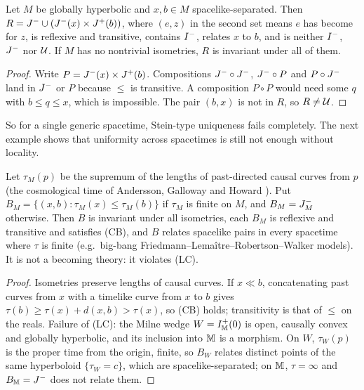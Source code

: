 \begin{proposition}\label{prop:single}
Let $M$ be globally hyperbolic and $x,b\in M$ spacelike-separated. Then
$R=J^{-}\cup(J^{-}(x)\times J^{+}(b))$, where $(e,z)$ in the second set means $e$
has become for $z$, is reflexive and transitive, contains $I^{-}$, relates $x$
to $b$, and is neither $I^{-}$, $J^{-}$ nor $\mathcal U$. If $M$ has no nontrivial
isometries, $R$ is invariant under all of them.
\end{proposition}

\begin{proof}
Write $P=J^{-}(x)\times J^{+}(b)$. Compositions $J^{-}\circ J^{-}$, $J^{-}\circ P$ and
$P\circ J^{-}$ land in $J^{-}$ or $P$ because $\le$ is transitive. A composition
$P\circ P$ would need some $q$ with $b\le q\le x$, which is impossible. The
pair $(b,x)$ is not in $R$, so $R\neq\mathcal U$.
\end{proof}

So for a single generic spacetime, Stein-type uniqueness fails completely. The
next example shows that
uniformity across spacetimes is still not enough without locality.

\begin{proposition}\label{prop:nonlocal}
Let $\tau_M(p)$ be the supremum of the lengths of past-directed causal curves
from $p$ (the cosmological time of Andersson, Galloway and Howard
\citep{AGH1998}). Put $B_M=\{(x,b):\tau_M(x)\le\tau_M(b)\}$ if $\tau_M$ is
finite on $M$, and $B_M=J^{-}_M$ otherwise. Then $B$ is invariant under all
isometries, each $B_M$ is
reflexive and transitive and satisfies (CB), and $B$ relates spacelike pairs
in every spacetime where $\tau$ is finite (e.g.\ big-bang
Friedmann--Lemaître--Robertson--Walker models). It is not a becoming theory:
it violates (LC).
\end{proposition}

\begin{proof}
Isometries preserve lengths of causal curves. If $x\ll b$, concatenating
past curves from $x$ with a timelike curve from $x$ to $b$ gives
$\tau(b)\ge\tau(x)+d(x,b)>\tau(x)$, so (CB) holds; transitivity is that of
$\le$ on the reals. Failure of (LC): the Milne wedge $W=I^{+}_\mathbb M(0)$ is open,
causally convex and globally hyperbolic, and its inclusion into $\mathbb M$ is a
morphism. On $W$, $\tau_W(p)$ is the proper time from the origin, finite, so
$B_W$ relates distinct points of the same hyperboloid $\{\tau_W=c\}$, which are
spacelike-separated; on $\mathbb M$, $\tau=\infty$ and $B_\mathbb M=J^{-}$ does not relate
them.
\end{proof}
